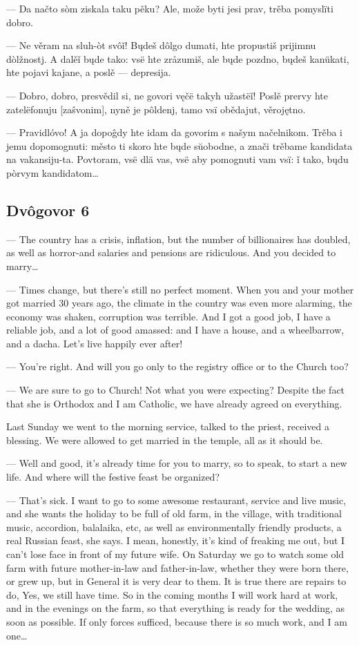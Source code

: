 — Da načto sòm ziskala taku pěku? Ale, može byti jesi prav, trěba pomyslïti dobro.

— Ne věram na sluh-òt svôǐ! Bųdeš dôlgo dumati, hte propustiš prijimnu dòlžnostj. A dalěǐ bųde tako: vsë hte zråzumiš, ale bųde pozdno, bųdeš kanükati, hte pojavi kajane, a poslě — depresija.

— Dobro, dobro, presvědil si, ne govori vęčë takyh užastëǐ! Poslě prervy hte zatelëfonuju [zaŝvonim], nyně je pôldenj, tamo vsï obědajut, věrojętno.

— Pravidlóvo! A ja dopoĝdy hte idam da govorim s našym načelnikom. Trěba i jemu dopomognuti: město ti skoro hte bųde sŭobodne, a znači trěbame kandidata na vakansiju-ta. Povtoram, vsë dlä vas, vsë aby pomognuti vam vsï: ǐ tako, bųdu pòrvym kandidatom…


\subsection{Dvôgovor 6}

— The country has a crisis, inflation, but the number of billionaires has doubled, as well as horror-and salaries and pensions are ridiculous. And you decided to marry…

— Times change, but there’s still no perfect moment. When you and your mother got married 30 years ago, the climate in the country was even more alarming, the economy was shaken, corruption was terrible. And I got a good job, I have a reliable job, and a lot of good amassed: and I have a house, and a wheelbarrow, and a dacha. Let’s live happily ever after!

— You’re right. And will you go only to the registry office or to the Church too?

— We are sure to go to Church! Not what you were expecting? Despite the fact that she is Orthodox and I am Catholic, we have already agreed on everything. 

Last Sunday we went to the morning service, talked to the priest, received a blessing. We were allowed to get married in the temple, all as it should be.

— Well and good, it’s already time for you to marry, so to speak, to start a new life. And where will the festive feast be organized?

— That’s sick. I want to go to some awesome restaurant, service and live music, and she wants the holiday to be full of old farm, in the village, with traditional music, accordion, balalaika, etc, as well as environmentally friendly products, a real Russian feast, she says. I mean, honestly, it’s kind of freaking me out, but I can’t lose face in front of my future wife. On Saturday we go to watch some old farm with future mother-in-law and father-in-law, whether they were born there, or grew up, but in General it is very dear to them. It is true there are repairs to do, Yes, we still have time. So in the coming months I will work hard at work, and in the evenings on the farm, so that everything is ready for the wedding, as soon as possible. If only forces sufficed, because there is so much work, and I am one…

